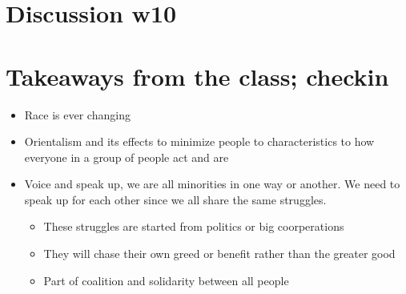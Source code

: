 \documentclass{article}
\begin{document}
\newpage

\section{Discussion w10}
\section*{Takeaways from the class; checkin}
\begin{itemize}
  \item Race is ever changing
  \item Orientalism and its effects to minimize people to
    characteristics to how everyone in a group of people act and are
  \item Voice and speak up, we are all minorities in one way or another.
    We need to speak up for each other since we all share
    the same struggles.
    \begin{itemize}
      \item These struggles are started from politics or big coorperations
      \item They will chase their own greed or benefit
        rather than the greater good
      \item Part of coalition and solidarity between all people
    \end{itemize}
\end{itemize}
\end{document}
